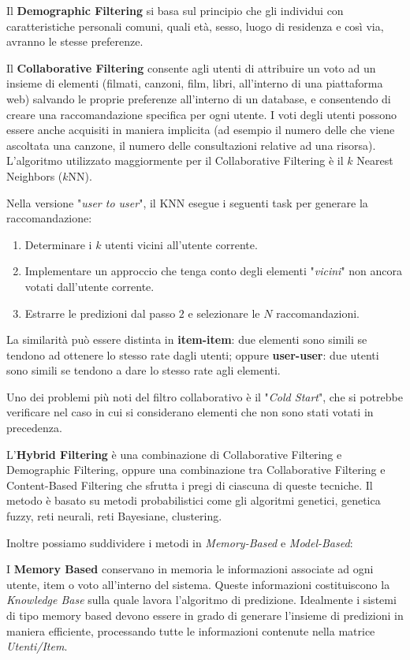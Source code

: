 \documentclass[11pt]{article}
\begin{document}
Il \textbf{Demographic Filtering} si basa sul principio che gli individui con caratteristiche personali comuni, quali età, sesso, luogo di residenza e così via, avranno le stesse preferenze.

Il \textbf{Collaborative Filtering} consente agli utenti di attribuire un voto ad un insieme di elementi (filmati, canzoni, film, libri, all'interno di una piattaforma web) salvando le proprie preferenze all'interno di un database, e consentendo di creare una raccomandazione specifica per ogni utente. I voti degli utenti possono essere anche acquisiti in maniera implicita (ad esempio il numero delle che viene ascoltata una canzone, il numero delle consultazioni relative ad una risorsa). L'algoritmo utilizzato maggiormente per il Collaborative Filtering è il $k$ Nearest Neighbors ($k$NN). 

Nella versione "\textit{user to user}", il KNN esegue i seguenti task per generare la raccomandazione:
\begin{enumerate}
\item Determinare i $k$ utenti vicini all'utente corrente.
\item Implementare un approccio che tenga conto degli elementi "\textit{vicini}" non ancora votati dall'utente corrente.
\item Estrarre le predizioni dal passo $2$ e selezionare le $N$ raccomandazioni.
\end{enumerate}

La similarità può essere distinta in \textbf{item-item}: due elementi sono simili se tendono ad ottenere lo stesso rate dagli utenti; oppure \textbf{user-user}: due utenti sono simili se tendono a dare lo stesso rate agli elementi.

Uno dei problemi più noti del filtro collaborativo è il "\textit{Cold Start}", che si potrebbe verificare nel caso in cui si considerano elementi che non sono stati votati in precedenza.

L'\textbf{Hybrid Filtering} è una combinazione di Collaborative Filtering e Demographic Filtering, oppure una combinazione tra Collaborative Filtering e Content-Based Filtering che sfrutta i pregi di ciascuna di queste tecniche. Il metodo è basato su metodi probabilistici come gli algoritmi genetici, genetica fuzzy, reti neurali, reti Bayesiane, clustering.

Inoltre possiamo suddividere i metodi in \textit{Memory-Based} e \textit{Model-Based}:

I \textbf{Memory Based} conservano in memoria le informazioni associate ad ogni utente, item o voto all'interno del sistema. Queste informazioni costituiscono la \textit{Knowledge Base} sulla quale lavora l'algoritmo di predizione. Idealmente i sistemi di tipo memory based devono essere in grado di generare l'insieme di predizioni in maniera efficiente, processando tutte le informazioni contenute nella matrice
\textit{Utenti/Item}.
\end{document}
